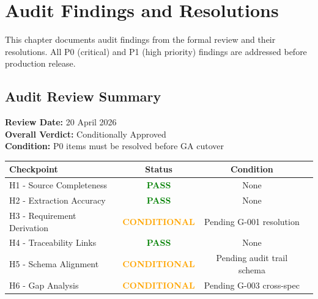 \chapter{Audit Findings and Resolutions}
\label{ch:audit-findings}

This chapter documents audit findings from the formal review and their 
resolutions. All P0 (critical) and P1 (high priority) findings are 
addressed before production release.

\section{Audit Review Summary}
\label{sec:audit-summary}

\begin{tcolorbox}[colback=yellow!10,colframe=yellow!50!black,title=Audit Status: Conditionally Approved]
\textbf{Review Date:} 20 April 2026\\
\textbf{Overall Verdict:} Conditionally Approved\\
\textbf{Condition:} P0 items must be resolved before GA cutover

\vspace{0.5em}
\begin{tabular}{lccl}
\toprule
\textbf{Checkpoint} & \textbf{Status} & \textbf{Condition} \\
\midrule
H1 - Source Completeness & \textcolor{green}{\textbf{PASS}} & None \\
H2 - Extraction Accuracy & \textcolor{green}{\textbf{PASS}} & None \\
H3 - Requirement Derivation & \textcolor{orange}{\textbf{CONDITIONAL}} & Pending G-001 resolution \\
H4 - Traceability Links & \textcolor{green}{\textbf{PASS}} & None \\
H5 - Schema Alignment & \textcolor{orange}{\textbf{CONDITIONAL}} & Pending audit trail schema \\
H6 - Gap Analysis & \textcolor{orange}{\textbf{CONDITIONAL}} & Pending G-003 cross-spec \\
\bottomrule
\end{tabular}
\end{tcolorbox}

